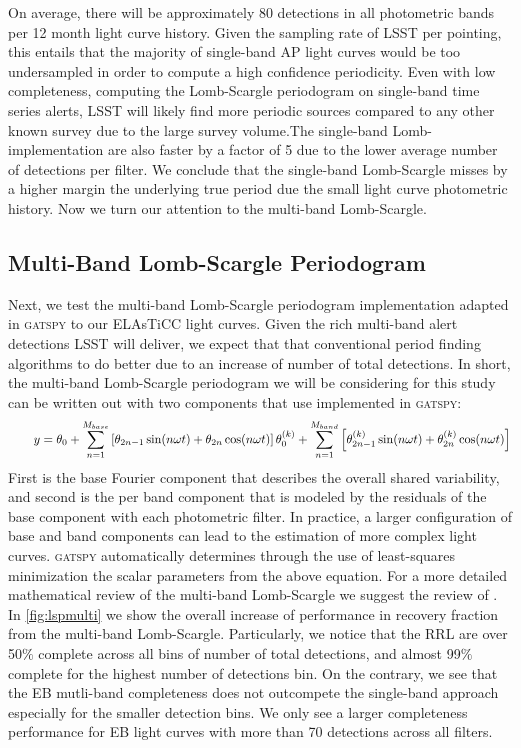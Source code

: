 \documentclass[DM,authoryear,toc]{lsstdoc}
\begin{document}
On average, there will be approximately 80 detections in all photometric bands per 12 month light curve history. Given the sampling rate of LSST per pointing, this entails that the majority of single-band AP light curves would be too undersampled in order to compute a high confidence periodicity. Even with low completeness, computing the Lomb-Scargle periodogram on single-band time series alerts, LSST will likely find more periodic sources compared to any other known survey due to the large survey volume.The single-band Lomb-implementation are also faster by a factor of 5 due to the lower average number of detections per filter.
We conclude that the single-band Lomb-Scargle misses by a higher margin the underlying true period due the small light curve photometric history. Now we turn our attention to the multi-band Lomb-Scargle.

\subsection{Multi-Band Lomb-Scargle Periodogram}
Next, we test the multi-band Lomb-Scargle periodogram implementation adapted in \textsc{gatspy} to our ELAsTiCC light curves.
Given the rich multi-band alert detections LSST will deliver, we expect that that conventional period finding algorithms to do better due to an increase of number of total detections.
In short, the multi-band Lomb-Scargle periodogram we will be considering for this study can be written out with two components that use implemented in \textsc{gatspy}:
\smallbreak{}
\begin{equation}
\qquad y = \theta_0+\sum_{n=1}^{M_{base}}\left[\theta_{2 n-1} \sin (n \omega t)+\theta_{2 n} \cos (n \omega t)\right] \\
\theta_0^{(k)}+\sum_{n=1}^{M _{band}}\left[\theta_{2 n-1}^{(k)} \sin (n \omega t)+\theta_{2 n}^{(k)} \cos (n \omega t)\right]
\end{equation}
\smallbreak{}
First is the base Fourier component that describes the overall shared variability, and second is the per band component that is modeled by the residuals of the base component with each photometric filter.
In practice, a larger configuration of base and band components can lead to the estimation of more complex light curves. \textsc{gatspy} automatically determines through the use of least-squares minimization the scalar parameters from the above equation. For a more detailed mathematical review of the multi-band Lomb-Scargle we suggest the review of \citet{VanderPlas:VP2015}. In \ref{fig:lspmulti} we show the overall increase of performance in recovery fraction from the multi-band Lomb-Scargle. Particularly, we notice that the RRL are over 50$\%$ complete across all bins of number of total detections, and almost 99$\%$ complete for the highest number of detections bin. On the contrary, we see that the EB mutli-band completeness does not outcompete the single-band approach especially for the smaller detection bins. We only see a larger completeness performance for EB light curves with more than 70 detections across all filters. 
\end{document}
